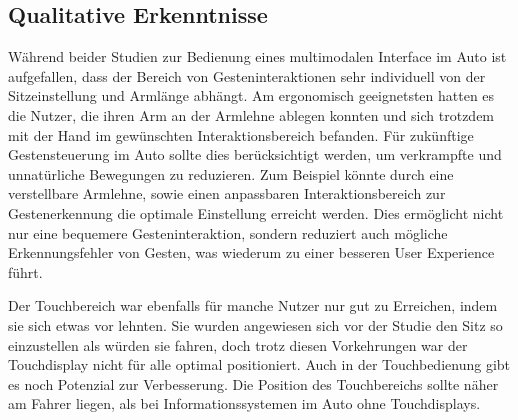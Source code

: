 \subsection[Qualitative Erkenntnisse]{Qualitative Erkenntnisse}
Während beider Studien zur Bedienung eines multimodalen Interface im Auto ist aufgefallen, dass der Bereich von Gesteninteraktionen sehr individuell von der Sitzeinstellung und Armlänge abhängt.
Am ergonomisch geeignetsten hatten es die Nutzer, die ihren Arm an der Armlehne ablegen konnten und sich trotzdem mit der Hand im gewünschten Interaktionsbereich befanden. 
Für zukünftige Gestensteuerung im Auto sollte dies berücksichtigt werden, um verkrampfte und unnatürliche Bewegungen zu reduzieren.
Zum Beispiel könnte durch eine verstellbare Armlehne, sowie einen anpassbaren Interaktionsbereich zur Gestenerkennung die optimale Einstellung erreicht werden.
Dies ermöglicht nicht nur eine bequemere Gesteninteraktion, sondern reduziert auch mögliche Erkennungsfehler von Gesten, was wiederum zu einer besseren User Experience führt.

Der Touchbereich war ebenfalls für manche Nutzer nur gut zu Erreichen, indem sie sich etwas vor lehnten.
Sie  wurden angewiesen sich vor der Studie den Sitz so einzustellen als würden sie fahren, doch trotz diesen Vorkehrungen war der Touchdisplay nicht für alle optimal positioniert.
Auch in der Touchbedienung gibt es noch Potenzial zur Verbesserung.
Die Position des Touchbereichs sollte näher am Fahrer liegen, als bei Informationssystemen im Auto ohne Touchdisplays.
